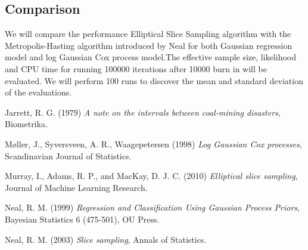 \documentclass{article}
\begin{document}
\subsection{Comparison}
We will compare the performance Elliptical Slice Sampling algorithm with the Metropolis-Hasting algorithm introduced by Neal \cite{Neal} 
for both Gaussian regression model and log Gaussian Cox process model.The effective sample size, likelihood and CPU time for running 100000 iterations after 10000 burn in will be evaluated. We will perform 100 runs to discover the mean and standard deviation of the evaluations. 


\begin{thebibliography}{12}

	Jarrett, R. G.  (1979)
	\emph{A note on the intervals between coal-mining disasters},
	Biometrika.

	M{\o}ller, J., Syversveen, A. R., Waagepetersen  (1998)
	\emph{Log Gaussian Cox processes},
	Scandinavian Journal of Statistics.

	Murray, I., Adams, R. P., and MacKay, D. J. C. (2010)
	\emph{Elliptical slice sampling},
	Journal of Machine Learning Research.
	
	Neal, R. M. (1999)
	\emph{Regression and Classification Using
Gaussian Process Priors},
	Bayesian Statistics 6 (475-501), OU Press.
	
	Neal, R. M. (2003)
	\emph{Slice sampling},
	Annals of Statistics.

\end{thebibliography}
\end{document}
